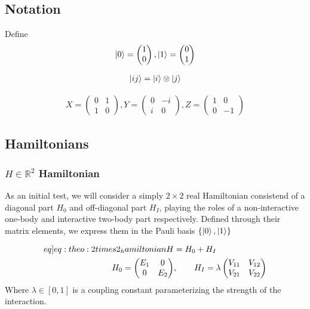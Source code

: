 \subsection{Notation}
Define 
\begin{align}
    \ket{0} = \begin{pmatrix}
        1 \\
        0
    \end{pmatrix}, \ket{1} = \begin{pmatrix}
        0 \\ 
        1
    \end{pmatrix}
\end{align}

\begin{align}
    \ket{ij} = \ket{i} \otimes \ket{j}
\end{align}

\begin{align}
    X = \begin{pmatrix}
        0 & 1 \\
        1 & 0
    \end{pmatrix}, Y = \begin{pmatrix}
        0 & -i \\
        i & 0
    \end{pmatrix}, Z = \begin{pmatrix}
        1 & 0 \\
        0 & -1
    \end{pmatrix}
\end{align}

\subsection{Hamiltonians}
\subsubsection{$H \in \mathbb{R}^2$ Hamiltonian}
As an initial test, we will consider a simply $2\times 2$ real Hamiltonian consistend of a diagonal part $H_0$ and off-diagonal part $H_I$, playing the roles of a non-interactive one-body and interactive two-body part respectively. Defined through their matrix elements, we express them in the Pauli basis $\{\ket{0},\ket{1}\}$

\begin{align}
    \begin{split} \label[eq]{eq:theo:2times2_hamiltonian}
        H &= H_0 + H_I \\
        H_0 = \begin{pmatrix}
            E_1 & 0 \\
            0 & E_2
        \end{pmatrix}&, \hspace{20px}
        H_I = \lambda \begin{pmatrix}
            V_{11} & V_{12} \\
            V_{21} & V_{22}
        \end{pmatrix}
    \end{split}
\end{align}
Where $\lambda \in [0,1]$ is a coupling constant parameterizing the strength of the interaction. 

